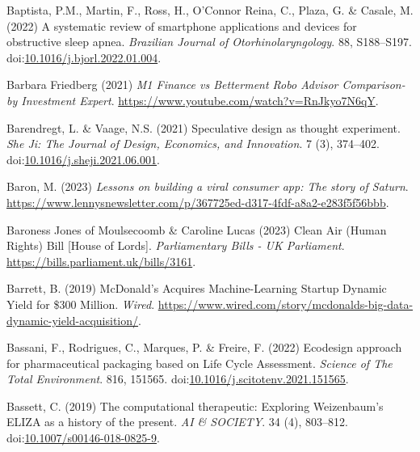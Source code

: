\documentclass[
  letterpaper,
  DIV=11,
  numbers=noendperiod]{scrartcl}
\newlength{\cslhangindent}
\newenvironment{CSLReferences}[2] %
 {\begin{list}{}{%
  \setlength{\itemindent}{0pt}
  \setlength{\leftmargin}{0pt}
  \setlength{\parsep}{0pt}
  \ifodd #1
   \setlength{\leftmargin}{\cslhangindent}
   \setlength{\itemindent}{-1\cslhangindent}
  \fi
  \setlength{\itemsep}{#2\baselineskip}}}
 {\end{list}}
\begin{document}
\begin{CSLReferences}{0}{1}
Baptista, P.M., Martin, F., Ross, H., O'Connor Reina, C., Plaza, G. \&
Casale, M. (2022) A systematic review of smartphone applications and
devices for obstructive sleep apnea. \emph{Brazilian Journal of
Otorhinolaryngology}. 88, S188--S197.
doi:\href{https://doi.org/10.1016/j.bjorl.2022.01.004}{10.1016/j.bjorl.2022.01.004}.

Barbara Friedberg (2021) \emph{M1 {Finance} vs {Betterment Robo Advisor
Comparison-by Investment Expert}}.
\url{https://www.youtube.com/watch?v=RnJkyo7N6qY}.

Barendregt, L. \& Vaage, N.S. (2021) Speculative design as thought
experiment. \emph{She Ji: The Journal of Design, Economics, and
Innovation}. 7 (3), 374--402.
doi:\href{https://doi.org/10.1016/j.sheji.2021.06.001}{10.1016/j.sheji.2021.06.001}.

Baron, M. (2023) \emph{Lessons on building a viral consumer app: {The}
story of {Saturn}}.
\url{https://www.lennysnewsletter.com/p/367725ed-d317-4fdf-a8a2-e283f5f56bbb}.

Baroness Jones of Moulsecoomb \& Caroline Lucas (2023) Clean {Air}
({Human Rights}) {Bill} {[}{House} of {Lords}{]}. \emph{Parliamentary
Bills - UK Parliament}. \url{https://bills.parliament.uk/bills/3161}.

Barrett, B. (2019) {McDonald}'s {Acquires Machine-Learning Startup
Dynamic Yield} for \$300 {Million}. \emph{Wired}.
\url{https://www.wired.com/story/mcdonalds-big-data-dynamic-yield-acquisition/}.

Bassani, F., Rodrigues, C., Marques, P. \& Freire, F. (2022) Ecodesign
approach for pharmaceutical packaging based on {Life Cycle Assessment}.
\emph{Science of The Total Environment}. 816, 151565.
doi:\href{https://doi.org/10.1016/j.scitotenv.2021.151565}{10.1016/j.scitotenv.2021.151565}.

Bassett, C. (2019) The computational therapeutic: Exploring
{Weizenbaum}'s {ELIZA} as a history of the present. \emph{AI \&
SOCIETY}. 34 (4), 803--812.
doi:\href{https://doi.org/10.1007/s00146-018-0825-9}{10.1007/s00146-018-0825-9}.


\end{CSLReferences}
\end{document}
